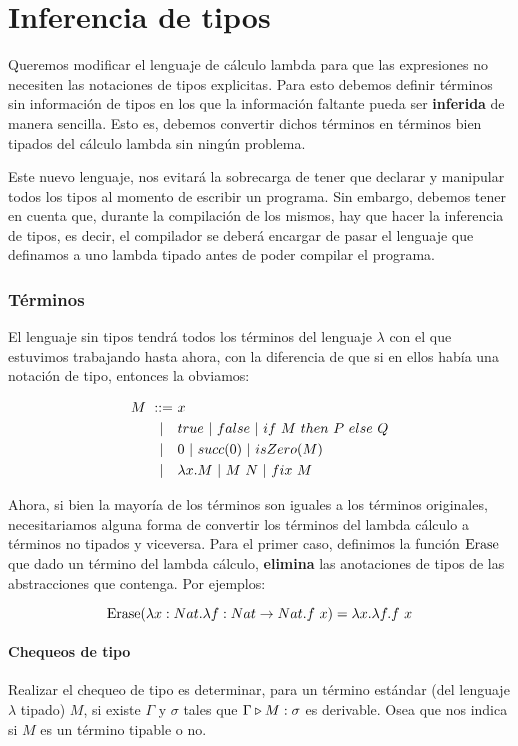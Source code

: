 \section{Inferencia de tipos}

Queremos modificar el lenguaje de cálculo lambda para que las expresiones no necesiten las notaciones de tipos explicitas. Para esto debemos definir términos sin información de tipos en los que la información faltante pueda ser \textbf{inferida} de manera sencilla. Esto es, debemos convertir dichos términos en términos bien tipados del cálculo lambda sin ningún problema.

Este nuevo lenguaje, nos evitará la sobrecarga de tener que declarar y manipular todos los tipos al momento de escribir un programa. Sin embargo, debemos tener en cuenta que, durante la compilación de los mismos, hay que hacer la inferencia de tipos, es decir, el compilador se deberá encargar de pasar el lenguaje que definamos a uno lambda tipado antes de poder compilar el programa.

\subsubsection*{Términos}
El lenguaje sin tipos tendrá todos los términos del lenguaje $\lambda$ con el que estuvimos trabajando hasta ahora, con la diferencia de que si en ellos había una notación de tipo, entonces la obviamos:

\begin{equation*}
	\begin{split}
		M~::=~&x \\
		|~~~&true~|~false~|~if~ M~ then~ P~ else~ Q \\
		|~~~&0~|~succ(0)~|~isZero(M) \\
		|~~~& \lambda x. M~|~M~N~|~fix~M
	\end{split}
\end{equation*}

Ahora, si bien la mayoría de los términos son iguales a los términos originales, necesitariamos alguna forma de convertir los términos del lambda cálculo a términos no tipados y viceversa. Para el primer caso, definimos la función $\operatorname{Erase}$ que dado un término del lambda cálculo, \textbf{elimina} las anotaciones de tipos de las abstracciones que contenga. Por ejemplos: 

$$\operatorname{Erase}(\lambda x: Nat . \lambda f: Nat\to Nat . f~x) = \lambda x. \lambda f. f~x$$

\paragraph{Chequeos de tipo}
Realizar el chequeo de tipo es determinar, para un término estándar (del lenguaje $\lambda$ tipado) $M$, si existe $\Gamma$ y $\sigma$ tales que $\Gamma\triangleright M : \sigma$ es derivable. Osea que nos indica si $M$ es un término tipable o no.

